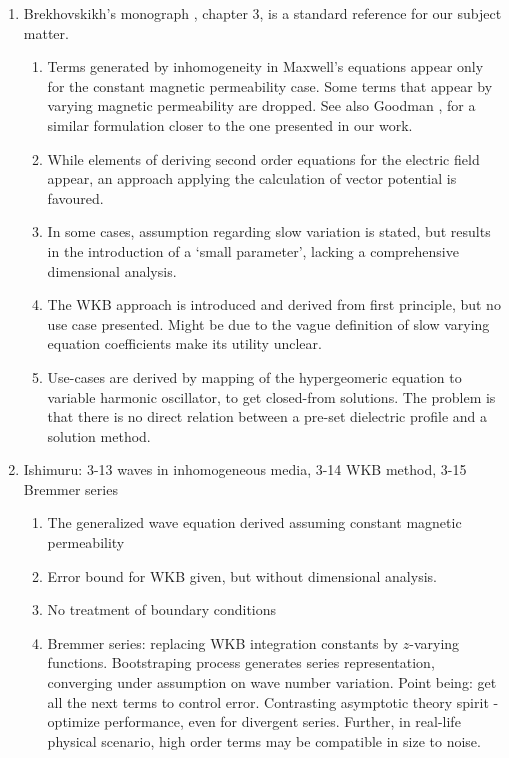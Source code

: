 \documentclass[twocolumn,secnumarabic,amssymb, nobibnotes, aps, prd]{revtex4-1}
\begin{document}
\begin{enumerate}
\item Brekhovskikh's monograph \cite{Brekhovskikh1960}, chapter 3, is a standard reference for our subject matter. 
\begin{enumerate}
\item Terms generated by inhomogeneity in Maxwell's equations appear only for the constant magnetic permeability case. Some terms that appear by varying magnetic permeability are dropped. See also Goodman \cite{goodman2005introduction}, for a similar formulation closer to the one presented in our work. 
\item While elements of deriving second order  equations for the electric field appear, an approach applying the calculation of vector potential is favoured.
\item In some cases, assumption regarding slow variation is stated, but results in the introduction of a `small parameter', lacking a comprehensive dimensional analysis.
\item The WKB approach is introduced and derived from first principle, but no use case presented. Might be due to the vague definition of slow varying equation coefficients make its utility unclear.
\item Use-cases are derived by mapping of the hypergeomeric equation to variable harmonic oscillator, to get closed-from solutions. The problem is that there is no direct relation between a pre-set dielectric profile and a solution method. 
\end{enumerate}
\item Ishimuru: 3-13 waves in inhomogeneous media, 3-14 WKB method, 3-15 Bremmer series
\begin{enumerate}
\item The generalized wave equation derived assuming constant magnetic permeability
\item Error bound for WKB given, but without dimensional analysis.
\item No treatment of boundary conditions 
\item Bremmer series: replacing WKB integration constants by $z$-varying functions. Bootstraping process generates series  representation, converging under assumption on wave number variation. Point being: get all the next terms to control error. Contrasting asymptotic theory spirit - optimize performance, even for divergent series.  Further, in real-life physical scenario, high order terms may be compatible in size to noise. 
\end{enumerate}

\end{enumerate}
\end{document}
